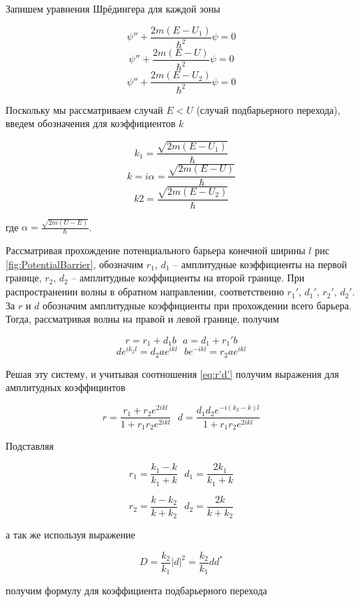 \documentclass[a4paper, 12pt]{article}
\begin{document}
    Запишем уравнения Шрёдингера для каждой зоны

    \[ \psi'' + \frac{2m(E - U_1)}{\hbar^2} \psi = 0 \]
    \[ \psi'' + \frac{2m(E - U)}{\hbar^2} \psi = 0 \]
    \[ \psi'' + \frac{2m(E - U_2)}{\hbar^2} \psi = 0 \]
    
    Поскольку мы рассматриваем случай $E < U$ (случай подбарьерного перехода), введем обозначения для коэффициентов $k$

    \[ k_1 = \frac{\sqrt{2m(E - U_1)}}{\hbar} \]
    \[ k = i \alpha = \frac{\sqrt{2m(E - U)}}{\hbar} \]
    \[ k2 = \frac{\sqrt{2m(E - U_2)}}{\hbar} \]
    
    где $\displaystyle \alpha = \frac{\sqrt{2m(U - E)}}{\hbar}$.

    Рассматривая прохождение потенциального барьера конечной ширины $l$ рис \ref{fig:PotentialBarrier}, обозначим
    $r_1$, $d_1$ -- амплитудные коэффициенты на первой границе, $r_2$, $d_2$ -- амплитудные коэффициенты на второй границе.
    При распространении волны в обратном направлении, соответственно $r_1'$, $d_1'$, $r_2'$, $d_2'$. 
    За  $r$ и $d$ обозначим амплитудные коэффициенты при прохождении всего барьера. Тогда, рассматривая волны
    на правой и левой границе, получим

    \[ r = r_1 + d_1 b ~~~ a = d_1 + r_1' b \]
    \[ d e^{ik_2l} = d_2 a e^{ikl} ~~~ b e^{-ikl} = r_2 a e^{ikl} \]
    
    Решая эту систему, и учитывая соотношения \eqref{eq:r'd'} получим выражения для амплитудных коэффицинтов

    \begin{equation}
        r = \frac{r_1 + r_2 e^{2ikl}}{1 + r_1 r_2 e^{2ikl}} ~~~ d = \frac{d_1 d_2 e^{-i(k_2 - k)l}}{1 + r_1 r_2 e^{2ikl}}
    \end{equation}

    Подставляя

    \begin{equation}
        r_1 = \frac{k_1 - k}{k_1 + k} ~~~ d_1 = \frac{2k_1}{k_1 + k}
    \end{equation}

    \begin{equation}
        r_2 = \frac{k - k_2}{k + k_2} ~~~ d_2 = \frac{2k}{k + k_2}
    \end{equation}

    а так же используя выражение 

    \[ D = \frac{k_2}{k_1} |d|^2 = \frac{k_2}{k_1} d d^*  \]

    получим формулу для коэффициента подбарьерного перехода
\end{document}
